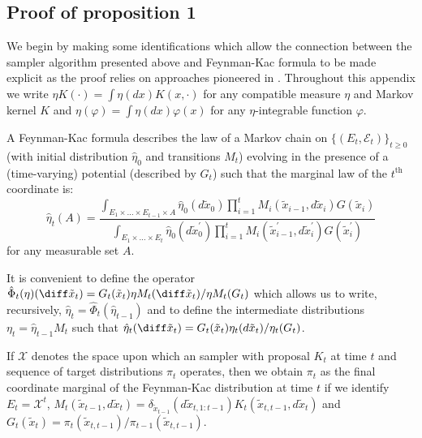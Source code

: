\subsection{Proof of proposition 1}
\label{sub:Proof of proposition 1}

We begin by making some identifications which allow the connection between the
\smc sampler algorithm presented above and Feynman-Kac formula to be made
explicit as the proof relies on approaches pioneered in
\cite{DelMoral:2004ux}. Throughout this appendix we write $\eta K(\cdot) =
\int \eta(dx) K(x,\cdot)$ for any compatible measure $\eta$ and Markov kernel
$K$ and $\eta(\varphi) = \int \eta(dx) \varphi(x)$ for any $\eta$-integrable
function $\varphi$.

A Feynman-Kac formula describes the law of a Markov chain on
$\{(E_t,\mathcal{E}_t)\}_{t\geq 0}$ (with initial distribution
$\hat\eta_0$ and transitions $M_t$) evolving in the presence of a
(time-varying) potential (described by $G_t$) such that the marginal law of
the $t^\text{th}$ coordinate is:
\begin{equation*}
  \hat\eta_t(A) = \frac
  {
    \int_{E_1 \times \ldots \times E_{t-1} \times A}
    \hat\eta_0(d\tilde{x}_0)
    \prod_{i=1}^t M_{i}(\tilde{x}_{i-1},d\tilde{x}_i)
    G(\tilde{x}_i)
  }{
    \int_{E_1 \times \ldots \times E_{t}}
    \hat\eta_0(d\tilde{x}^\prime_0)
    \prod_{i=1}^t M_{i}(\tilde{x}^\prime_{i-1},d\tilde{x}^\prime_i)
    G(\tilde{x}^\prime_i)
  }
\end{equation*}
for any measurable set $A$.

It is convenient to define the operator $\hat\Phi_t(\eta)(\diff
\tilde{x}_t) = G_t(\tilde{x}_t)\eta M_t(\diff \tilde{x}_t)/\eta
M_t(G_t)$ which allows us to write, recursively, $\hat\eta_t =
\hat\Phi_t(\hat\eta_{t-1})$ and to define the intermediate
distributions $\eta_t = \hat\eta_{t-1}M_t$ such that $\hat\eta_t(\diff
\tilde{x}_t) = G_t(\tilde{x}_t) \eta_t(d\tilde{x}_t) /
\eta_t(G_t)$.

If $\mathcal{X}$ denotes the space upon which an \smc sampler with \mcmc
proposal $K_t$ at time $t$ and sequence of target distributions $\pi_t$
operates, then we obtain $\pi_t$ as the final coordinate marginal of the
Feynman-Kac distribution at time $t$ if we identify $E_t = \mathcal{X}^t$,
$M_{t}(\tilde{x}_{t-1},d\tilde{x}_t) =
\delta_{\tilde{x}_{t-1}}(d\tilde{x}_{t,1:t-1})
K_t(\tilde{x}_{t,t-1},d\tilde{x}_t)$ and $G_t(\tilde{x}_t) =
\pi_{t}(\tilde{x}_{t,t-1}) / \pi_{t-1}(\tilde{x}_{t,t-1})$.

